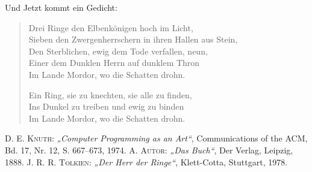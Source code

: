 \documentclass{scrreprt}
\begin{document}
	Und Jetzt kommt ein Gedicht:
	\begin{verse}
		Drei Ringe den Elbenkönigen hoch im Licht,\\		
		Sieben den Zwergenherrschern in ihren Hallen aus Stein,\\
		Den Sterblichen, ewig dem Tode verfallen, neun,\\
		Einer dem Dunklen Herrn auf dunklem Thron\\
		Im Lande Mordor, wo die Schatten drohn.
		
		Ein Ring, sie zu knechten, sie alle zu finden,\\
				Ins Dunkel zu treiben und ewig zu binden\\		
		Im Lande Mordor, wo die Schatten drohn. \cite[S.\,7]{tolkien66}
	\end{verse}
	
	
	\appendix
		\printindex
	
		\begin{thebibliography}{9}
			 \textsc{D. E. Knuth}: \textit{„Computer Programming as an Art“},  Communications of the ACM, Bd. 17, Nr. 12, S. 667–673, 1974.
			 \textsc{A. Autor}: \textit{„Das Buch“}, Der Verlag, Leipzig, 1888.
			 \textsc{J. R. R. Tolkien}: \textit{„Der Herr der Ringe“}, Klett-Cotta, Stuttgart, 1978.
		\end{thebibliography}
\end{document}
